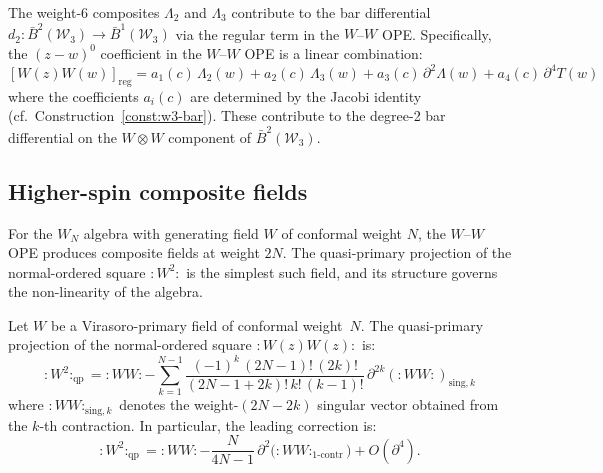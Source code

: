 \begin{remark}\label{rem:regular-term-bar}
The weight-6 composites $\Lambda_2$ and $\Lambda_3$ contribute to
the bar differential $d_2\colon \bar{B}^2(\mathcal{W}_3) \to
\bar{B}^1(\mathcal{W}_3)$ via the regular term in the $W$--$W$
OPE.  Specifically, the $(z-w)^0$ coefficient in the $W$--$W$ OPE
is a linear combination:
\[
[W(z)W(w)]_{\text{reg}} = a_1(c)\,\Lambda_2(w) + a_2(c)\,\Lambda_3(w)
  + a_3(c)\,\partial^2\Lambda(w) + a_4(c)\,\partial^4 T(w)
\]
where the coefficients $a_i(c)$ are determined by the Jacobi identity
(cf.\ Construction~\ref{const:w3-bar}).  These contribute to
the degree-2 bar differential on the $W \otimes W$ component of
$\bar{B}^2(\mathcal{W}_3)$.
\end{remark}

\subsection{Higher-spin composite fields}
\label{sec:higher-spin-composites}

For the $W_N$ algebra with generating field $W$ of conformal
weight $N$, the $W$--$W$ OPE produces composite fields at
weight $2N$.  The quasi-primary projection of the normal-ordered
square ${:}W^2{:}$ is the simplest such field, and its structure
governs the non-linearity of the algebra.

\begin{proposition}\label{prop:W-squared-qp}
Let $W$ be a Virasoro-primary field of conformal weight~$N$.
The quasi-primary projection of the normal-ordered square
${:}W(z)W(z){:}$ is:
\begin{equation}\label{eq:W-squared-qp}
{:}W^2{:}_{\mathrm{qp}} = {:}WW{:}
  - \sum_{k=1}^{N-1} \frac{(-1)^k\,(2N-1)!\,(2k)!}{(2N-1+2k)!\,k!\,(k-1)!}
  \,\partial^{2k}({:}WW{:})_{\mathrm{sing},k}
\end{equation}
where ${:}WW{:}_{\mathrm{sing},k}$ denotes the weight-$(2N-2k)$
singular vector obtained from the $k$-th contraction.
In particular, the leading correction is:
\[
{:}W^2{:}_{\mathrm{qp}} = {:}WW{:}
  - \frac{N}{4N-1}\,\partial^2\bigl({:}WW{:}_{\text{1-contr}}\bigr)
  + O(\partial^4).
\]
\end{proposition}


